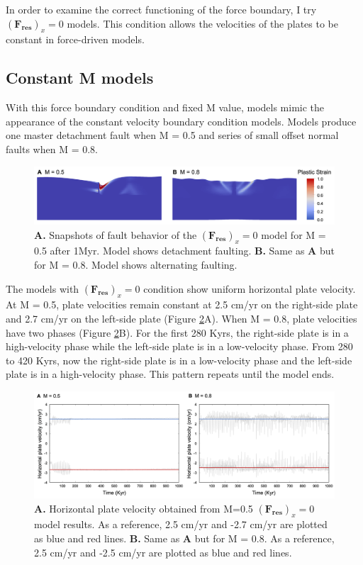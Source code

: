 \documentclass[letterpaper,12pt,notitle]{memphisthesis}                     %
\begin{document}
In order to examine the correct functioning of the force boundary, I try $(\boldsymbol{F_{res}})_x=0$ models. This  condition allows the velocities of the plates to be constant in force-driven models.

\subsection{Constant M models}

With this force boundary condition and fixed M value, models mimic the appearance of the constant velocity boundary condition models. Models produce one master detachment fault when M = 0.5 and series of small offset normal faults when M = 0.8.

\begin{figure}[!htb]
	\centering
	\includegraphics[width=0.99\linewidth]{./figs/f0fault.png}
	\caption{\textbf{A.} Snapshots of fault behavior of the $(\boldsymbol{F_{res}})_x=0$ model for M = 0.5 after 1Myr. Model shows detachment faulting. \textbf{B.} Same as \textbf{A} but for M = 0.8. Model shows alternating faulting.}
	\label{fig:f0fault}
\end{figure}

The models with $(\boldsymbol{F_{res}})_x=0$ condition show uniform horizontal plate velocity. At M = 0.5, plate velocities remain constant at 2.5 cm/yr on the right-side plate and 2.7 cm/yr on the left-side plate (Figure \ref{fig:f0vel}A). When M = 0.8, plate velocities have two phases (Figure \ref{fig:f0vel}B). For the first 280 Kyrs, the right-side plate is in a high-velocity phase while the left-side plate is in a low-velocity phase. From 280 to 420 Kyrs, now the right-side plate is in a low-velocity phase and the left-side plate is in a high-velocity phase. This pattern repeats until the model ends.

\begin{figure}[!htb]
	\centering
	\includegraphics[width=0.99\linewidth]{./figs/f0vel.png}
	\caption{\textbf{A.} Horizontal plate velocity obtained from M=0.5 $(\boldsymbol{F_{res}})_x=0$ model results. As a reference, 2.5 cm/yr and -2.7 cm/yr are plotted as blue and red lines. \textbf{B.} Same as \textbf{A} but for M = 0.8. As a reference, 2.5 cm/yr and -2.5 cm/yr are plotted as blue and red lines.}
	\label{fig:f0vel}
\end{figure}
\end{document}
